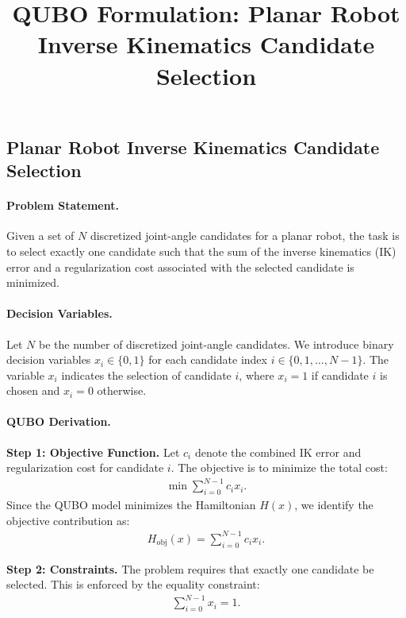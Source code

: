 \documentclass[12pt]{article}
\title{QUBO Formulation: Planar Robot Inverse Kinematics Candidate Selection}
\date{}
\begin{document}
\maketitle

\subsection*{Planar Robot Inverse Kinematics Candidate Selection}

\paragraph{Problem Statement.}
Given a set of $N$ discretized joint-angle candidates for a planar robot, the task is to select exactly one candidate such that the sum of the inverse kinematics (IK) error and a regularization cost associated with the selected candidate is minimized.

\paragraph{Decision Variables.}
Let $N$ be the number of discretized joint-angle candidates. We introduce binary decision variables $x_i \in \{0, 1\}$ for each candidate index $i \in \{0, 1, \dots, N-1\}$. The variable $x_i$ indicates the selection of candidate $i$, where $x_i = 1$ if candidate $i$ is chosen and $x_i = 0$ otherwise.

\paragraph{QUBO Derivation.}
\textbf{Step 1: Objective Function.}
Let $c_i$ denote the combined IK error and regularization cost for candidate $i$. The objective is to minimize the total cost:
\begin{align}
    \min \sum_{i=0}^{N-1} c_i x_i.
\end{align}
Since the QUBO model minimizes the Hamiltonian $H(x)$, we identify the objective contribution as:
\begin{align}
    H_{\text{obj}}(x) = \sum_{i=0}^{N-1} c_i x_i.
\end{align}

\textbf{Step 2: Constraints.}
The problem requires that exactly one candidate be selected. This is enforced by the equality constraint:
\begin{align}
    \sum_{i=0}^{N-1} x_i = 1.
\end{align}
\end{document}
